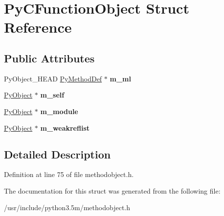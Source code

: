 \hypertarget{structPyCFunctionObject}{}\section{Py\+C\+Function\+Object Struct Reference}
\label{structPyCFunctionObject}
\subsection*{Public Attributes}
\begin{DoxyCompactItemize}
\item 
Py\+Object\+\_\+\+H\+E\+AD \hyperlink{structPyMethodDef}{Py\+Method\+Def} $\ast$ {\bfseries m\+\_\+ml}\hypertarget{structPyCFunctionObject_a8e1a57018487c9462d4f4c3c8ff14c8a}{}\label{structPyCFunctionObject_a8e1a57018487c9462d4f4c3c8ff14c8a}

\item 
\hyperlink{struct__object}{Py\+Object} $\ast$ {\bfseries m\+\_\+self}\hypertarget{structPyCFunctionObject_ad7a57b447920bb7a57224af1ac55383c}{}\label{structPyCFunctionObject_ad7a57b447920bb7a57224af1ac55383c}

\item 
\hyperlink{struct__object}{Py\+Object} $\ast$ {\bfseries m\+\_\+module}\hypertarget{structPyCFunctionObject_a654330d115976428e8f8230c6a4794be}{}\label{structPyCFunctionObject_a654330d115976428e8f8230c6a4794be}

\item 
\hyperlink{struct__object}{Py\+Object} $\ast$ {\bfseries m\+\_\+weakreflist}\hypertarget{structPyCFunctionObject_ac0cc535109a36f3b5cab797be62c2fad}{}\label{structPyCFunctionObject_ac0cc535109a36f3b5cab797be62c2fad}

\end{DoxyCompactItemize}


\subsection{Detailed Description}


Definition at line 75 of file methodobject.\+h.



The documentation for this struct was generated from the following file\+:\begin{DoxyCompactItemize}
\item 
/usr/include/python3.\+5m/methodobject.\+h\end{DoxyCompactItemize}
